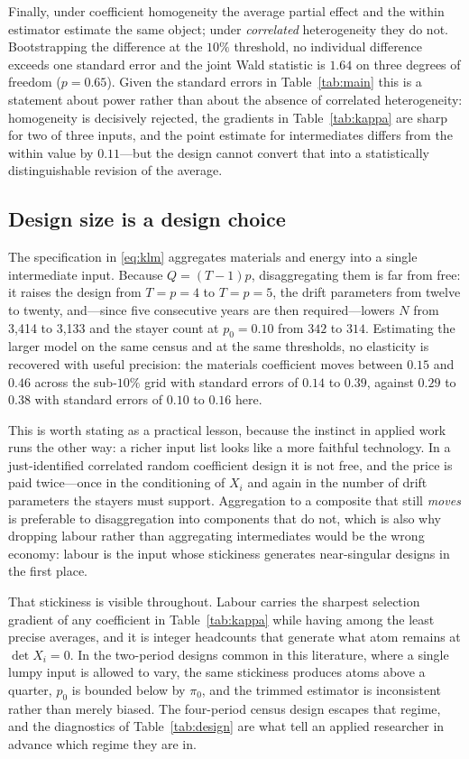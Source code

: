 Finally, under coefficient homogeneity the average partial effect and the
within estimator estimate the same object; under \emph{correlated}
heterogeneity they do not. Bootstrapping the difference at the $10\%$
threshold, no individual difference exceeds one standard error and the joint
Wald statistic is $1.64$ on three degrees of freedom ($p = 0.65$). Given the
standard errors in Table~\ref{tab:main} this is a statement about power rather
than about the absence of correlated heterogeneity: homogeneity is decisively
rejected, the gradients in Table~\ref{tab:kappa} are sharp for two of three
inputs, and the point estimate for intermediates differs from the within value
by $0.11$---but the design cannot convert that into a statistically
distinguishable revision of the average.

\subsection{Design size is a design choice}
\label{sec:designsize}

The specification in \eqref{eq:klm} aggregates materials and energy into a
single intermediate input. Because $Q = (T-1)p$, disaggregating them is far
from free: it raises the design from $T = p = 4$ to $T = p = 5$, the drift
parameters from twelve to twenty, and---since five consecutive years are then
required---lowers $N$ from 3{,}414 to 3{,}133 and the stayer count at
$p_0 = 0.10$ from $342$ to $314$. Estimating the larger model on the same
census and at the same thresholds, no elasticity is recovered with useful
precision: the materials coefficient moves between $0.15$ and $0.46$ across the
sub-$10\%$ grid with standard errors of $0.14$ to $0.39$, against $0.29$ to
$0.38$ with standard errors of $0.10$ to $0.16$ here.

This is worth stating as a practical lesson, because the instinct in applied
work runs the other way: a richer input list looks like a more faithful
technology. In a just-identified correlated random coefficient design it is not
free, and the price is paid twice---once in the conditioning of $X_i$ and again
in the number of drift parameters the stayers must support. Aggregation to a
composite that still \emph{moves} is preferable to disaggregation into
components that do not, which is also why dropping labour rather than
aggregating intermediates would be the wrong economy: labour is the input whose
stickiness generates near-singular designs in the first place.

That stickiness is visible throughout. Labour carries the sharpest selection
gradient of any coefficient in Table~\ref{tab:kappa} while having among the
least precise averages, and it is integer headcounts that generate what atom
remains at $\det X_i = 0$. In the two-period designs common in this literature,
where a single lumpy input is allowed to vary, the same stickiness produces
atoms above a quarter, $p_0$ is bounded below by $\pi_0$, and the trimmed
estimator is inconsistent rather than merely biased. The four-period census
design escapes that regime, and the diagnostics of Table~\ref{tab:design} are
what tell an applied researcher in advance which regime they are in.
